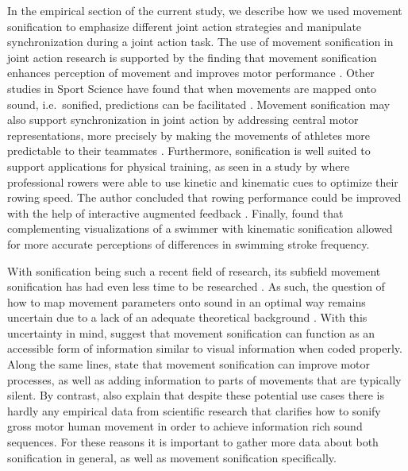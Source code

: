 \documentclass[10pt,a4paper,onecolumn]{article}
\begin{document}
In the empirical section of the current study, we describe how we used movement sonification to emphasize different joint action strategies and manipulate synchronization during a joint action task. The use of movement sonification in joint action research is supported by the finding that movement sonification enhances perception of movement and improves motor performance \autocite{schmitzObservationSonifiedMovements2013}. Other studies in Sport Science have found that when movements are mapped onto sound, i.e.~sonified, predictions can be facilitated \autocite{effenbergMovementSonificationEffects2005,schmitzPerceptualEffectsAuditory2012}. Movement sonification may also support synchronization in joint action by addressing central motor representations, more precisely by making the movements of athletes more predictable to their teammates \autocite{schmitzPerceptualEffectsAuditory2012}. Furthermore, sonification is well suited to support applications for physical training, as seen in a study by \textcite{dubusEvaluationFourModels2012} where professional rowers were able to use kinetic and kinematic cues to optimize their rowing speed. The author concluded that rowing performance could be improved with the help of interactive augmented feedback \autocite{dubusEvaluationFourModels2012}. Finally, \textcite{schmitzSoundJoinedActions2017} found that complementing visualizations of a swimmer with kinematic sonification allowed for more accurate perceptions of differences in swimming stroke frequency.

With sonification being such a recent field of research, its subfield movement sonification has had even less time to be researched \autocite{vinkenAuditoryCodingHuman2013}. As such, the question of how to map movement parameters onto sound in an optimal way remains uncertain due to a lack of an adequate theoretical background \autocite{effenbergAccelerationDecelerationConstant2018}. With this uncertainty in mind, \textcite{effenbergAccelerationDecelerationConstant2018} suggest that movement sonification can function as an accessible form of information similar to visual information when coded properly. Along the same lines, \textcite{vinkenAuditoryCodingHuman2013} state that movement sonification can improve motor processes, as well as adding information to parts of movements that are typically silent. By contrast, \textcite{vinkenAuditoryCodingHuman2013} also explain that despite these potential use cases there is hardly any empirical data from scientific research that clarifies how to sonify gross motor human movement in order to achieve information rich sound sequences. For these reasons it is important to gather more data about both sonification in general, as well as movement sonification specifically.
\end{document}

